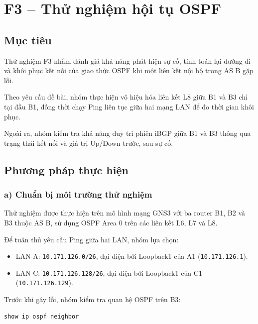 

\section{F3 -- Thử nghiệm hội tụ OSPF}

\subsection{Mục tiêu}

Thử nghiệm F3 nhằm đánh giá khả năng phát hiện sự cố,
tính toán lại đường đi và khôi phục kết nối của giao thức
OSPF khi một liên kết nội bộ trong AS B gặp lỗi.

Theo yêu cầu đề bài, nhóm thực hiện vô hiệu hóa liên kết
L8 giữa B1 và B3 chỉ tại đầu B1, đồng thời chạy Ping
liên tục giữa hai mạng LAN để đo thời gian khôi phục.

Ngoài ra, nhóm kiểm tra khả năng duy trì phiên iBGP
giữa B1 và B3 thông qua trạng thái kết nối và
giá trị Up/Down trước, sau sự cố.

\subsection{Phương pháp thực hiện}

\subsubsection{a) Chuẩn bị môi trường thử nghiệm}

Thử nghiệm được thực hiện trên mô hình mạng GNS3
với ba router B1, B2 và B3 thuộc AS B,
sử dụng OSPF Area 0 trên các liên kết L6, L7 và L8.

Để tuân thủ yêu cầu Ping giữa hai LAN, nhóm lựa chọn:
\begin{itemize}
    \item LAN-A:
    \texttt{10.171.126.0/26}, đại diện bởi Loopback1
    của A1 (\texttt{10.171.126.1}).

    \item LAN-C:
    \texttt{10.171.126.128/26}, đại diện bởi Loopback1
    của C1 (\texttt{10.171.126.129}).
\end{itemize}

Trước khi gây lỗi, nhóm kiểm tra quan hệ OSPF trên B3:

\begin{lstlisting}
show ip ospf neighbor
\end{lstlisting}

